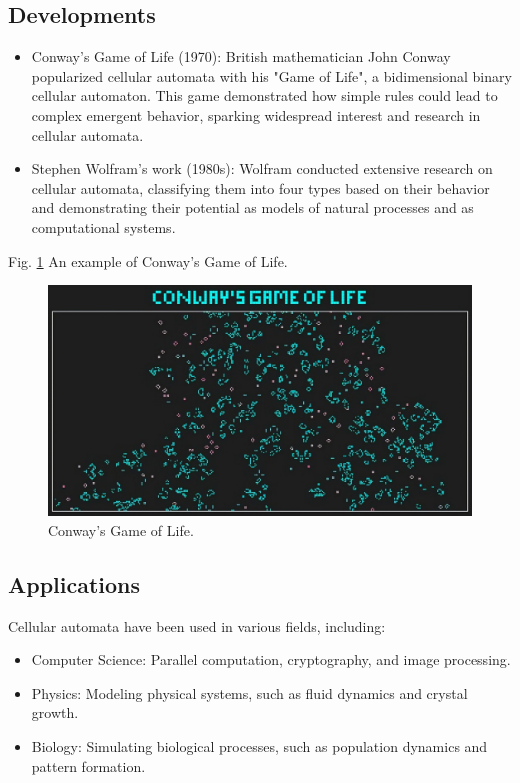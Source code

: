 \documentclass[9pt,a4paper,twoside]{tau-class/tau}
\begin{document}
    \subsection{Developments}
    \begin{itemize}
        \item Conway's Game of Life (1970): British mathematician John Conway popularized cellular
        automata with his "Game of Life", a bidimensional binary cellular automaton. 
        This game demonstrated how simple rules could lead to complex emergent behavior, 
        sparking widespread interest and research in cellular automata.

        \item Stephen Wolfram's work (1980s): Wolfram conducted extensive research on cellular
        automata, classifying them into four types based on their behavior and demonstrating 
        their potential as models of natural processes and as computational systems.
    \end{itemize}

    Fig. \ref{fig:figure} An example of Conway's Game of Life.
	\begin{figure}[H]
		\centering
		\includegraphics[width=0.75\columnwidth]{figures/gameOfLife.jpg}
		\caption{Conway's Game of Life.}
		\label{fig:figure}
	\end{figure}

    \subsection{Applications}
	
        Cellular automata have been used in various fields, including:
        
        \begin{itemize}
            \item Computer Science: Parallel computation, cryptography, and image processing.
            \item Physics: Modeling physical systems, such as fluid dynamics and crystal growth.
            \item Biology: Simulating biological processes, such as population dynamics and pattern formation.
        \end{itemize}
		
\end{document}
